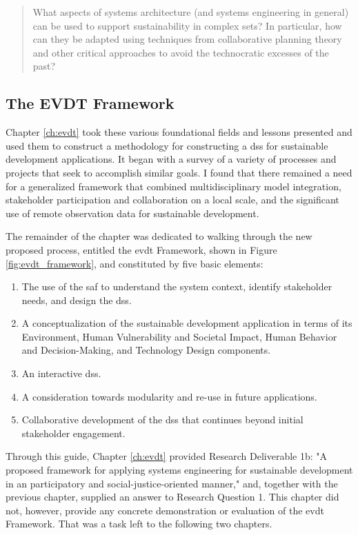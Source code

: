 \blockquote{What aspects of systems architecture (and systems engineering in general) can be used to support sustainability in complex \ac{sets}? In particular, how can they be adapted using techniques from collaborative planning theory and other critical approaches to avoid the technocratic excesses of the past?}

\subsection{The EVDT Framework}

Chapter \ref{ch:evdt} took these various foundational fields and lessons presented and used them to construct a methodology for constructing a \ac{dss} for sustainable development applications. It began with a survey of a variety of processes and projects that seek to accomplish similar goals. I found that there remained a need for a generalized framework that combined multidisciplinary model integration, stakeholder participation and collaboration on a local scale, and the significant use of remote observation data for sustainable development.

The remainder of the chapter was dedicated to walking through the new proposed process, entitled the \ac{evdt} Framework, shown in Figure \ref{fig:evdt_framework}, and constituted by five basic elements:

\begin{enumerate}[label=\emph{\Alph*)},itemsep=0pt,parsep=0pt]
	\item{The use of the \acf{saf} to understand the system context, identify stakeholder needs, and design the \ac{dss}.}
	\item{A conceptualization of the sustainable development application in terms of its Environment, Human Vulnerability and Societal Impact, Human Behavior and Decision-Making, and Technology Design components.}
	\item{An interactive \ac{dss}.}
	\item{A consideration towards modularity and re-use in future applications.}
	\item{Collaborative development of the \ac{dss} that continues beyond initial stakeholder engagement.}
\end{enumerate}

Through this guide, Chapter \ref{ch:evdt} provided Research Deliverable 1b: "A proposed framework for applying systems engineering for sustainable development in an participatory and social-justice-oriented manner," and, together with the previous chapter, supplied an answer to Research Question 1. This chapter did not, however, provide any concrete demonstration or evaluation of the \ac{evdt} Framework. That was a task left to the following two chapters.

